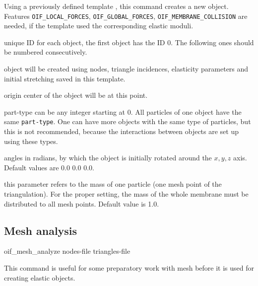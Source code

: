 Using a previously defined template , this command creates a new object. Features \verb|OIF_LOCAL_FORCES|, \verb|OIF_GLOBAL_FORCES|, \verb|OIF_MEMBRANE_COLLISION| are needed, if the template used the corresponding elastic moduli.

\begin{arguments}
\item[\var{oid}] unique ID for each object, the first object has the ID 0. The following ones should be numbered consecutively.
\item[\var{tid}] object will be created using nodes, triangle incidences, elasticity parameters and initial stretching saved in this template.
\item[origin \var{x} \var{y} \var{z}] center of the object will be at this point.
\item[part-type \var{type}] can be any integer starting at 0. All particles of one object have the same \verb|part-type|. One can have more objects with the same type of particles, but this is not recommended, because the interactions between objects are set up using these types.
\item[\opt{rotate \var{x} \var{y} \var{z}}] angles in radians, by which the object is initially rotated around the $x, y, z$ axis. Default values are 0.0 0.0 0.0.
\item[\opt{mass \var{m}}] this parameter refers to the mass of one particle (one mesh point of the triangulation). For the proper setting, the mass of the  whole membrane must be distributed to all mesh points. Default value is 1.0.
\end{arguments}

\subsection{\label{ssec:oif-mesh-analyze}Mesh analysis}

\begin{essyntax}
  oif_mesh_analyze
  nodes-file  
  triangles-file  
\end{essyntax}

This command is useful for some preparatory work with mesh before it is used for creating elastic objects.

